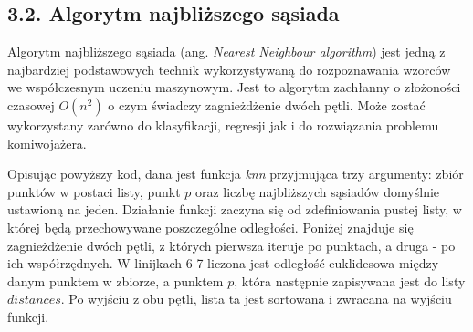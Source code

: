 \documentclass{article}
\begin{document}
\subsection*{\LARGE{3.2. Algorytm najbliższego sąsiada}} 

Algorytm najbliższego sąsiada (ang. \emph{Nearest Neighbour algorithm}) jest jedną z najbardziej podstawowych technik wykorzystywaną do rozpoznawania wzorców we współczesnym uczeniu maszynowym. Jest to algorytm zachłanny o złożoności czasowej $O(n^2)$ o czym świadczy zagnieżdżenie dwóch pętli. Może zostać wykorzystany zarówno do klasyfikacji, regresji jak i do rozwiązania problemu komiwojażera. 

\begin{comment}
Chcąc znaleźć najlepsze dopasowanie między dwoma zbiorami punktów potrzebujemy miary tego dopasowania. W tym celu posługujemy sumą odległości korespondujących punktów w metryce euklidesowej. Jeśli przyjmiemy, że po pomiarze odległości danego punktu - staje się on odwiedzony, taką metodę możemy rozpatrywać posługując się terminologią typową dla teorii grafów. Podany algorytm da się rozpisać w postaci listy kroków.

\begin{enumerate}
\item Ustawienie statutu wszystkich punktów jako nieodwiedzone.
\item Wybranie jednego z nich i zmierzenie odległości między nim a punktem $\vb{p}$.
\item Znalezienie najkrótszej odległości między 
\end{enumerate}
\end{comment}

\vspace{5mm}

\vspace{5mm}

Opisując powyższy kod, dana jest funkcja \emph{knn} przyjmująca trzy argumenty: zbiór punktów w postaci listy, punkt $p$ oraz liczbę najbliższych sąsiadów domyślnie ustawioną na jeden. Działanie funkcji zaczyna się od zdefiniowania pustej listy, w której będą przechowywane poszczególne odległości. Poniżej znajduje się zagnieżdżenie dwóch pętli, z których pierwsza iteruje po punktach, a druga - po ich współrzędnych. W linijkach 6-7 liczona jest odległość euklidesowa między danym punktem w zbiorze, a punktem $p$, która następnie zapisywana jest do listy $distances$. Po wyjściu z obu pętli, lista ta jest sortowana i zwracana na wyjściu funkcji.
\end{document}
